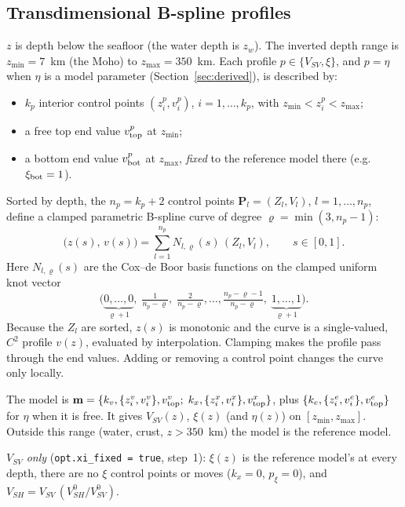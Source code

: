 \documentclass[11pt]{article}
\newcommand{\vsv}{V_{SV}}
\newcommand{\vsh}{V_{SH}}
\begin{document}
\subsection{Transdimensional B-spline profiles}
$z$ is depth below the seafloor (the water depth is $z_w$). The inverted
depth range is $z_{\min}=7$~km (the Moho) to $z_{\max}=350$~km. Each
profile $p\in\{\vsv,\xi\}$, and $p=\eta$ when $\eta$ is a model parameter
(Section~\ref{sec:derived}), is described by:
\begin{itemize}
\item $k_p$ interior control points $(z^p_i,v^p_i)$, $i=1,\dots,k_p$, with $z_{\min}<z^p_i<z_{\max}$;
\item a free top end value $v^p_{\rm top}$ at $z_{\min}$;
\item a bottom end value $v^p_{\rm bot}$ at $z_{\max}$, \emph{fixed} to the
  reference model there (e.g.\ $\xi_{\rm bot}=1$).
\end{itemize}
Sorted by depth, the $n_p=k_p+2$ control points $\mathbf{P}_l=(Z_l,V_l)$,
$l=1,\dots,n_p$, define a clamped parametric B-spline curve of degree
$\varrho=\min(3,n_p-1)$:
\begin{equation}
  \big(z(s),\,v(s)\big)=\sum_{l=1}^{n_p}N_{l,\varrho}(s)\,(Z_l,V_l),\qquad s\in[0,1].
\end{equation}
Here $N_{l,\varrho}(s)$ are the Cox--de Boor basis functions on the clamped
uniform knot vector
\begin{equation}
 \Big(\underbrace{0,\dots,0}_{\varrho+1},\;\tfrac{1}{n_p-\varrho},\;\tfrac{2}{n_p-\varrho},\dots,\tfrac{n_p-\varrho-1}{n_p-\varrho},\;\underbrace{1,\dots,1}_{\varrho+1}\Big).
\end{equation} Because the $Z_l$ are sorted, $z(s)$ is monotonic and
the curve is a single-valued, $C^2$ profile $v(z)$, evaluated by
interpolation. Clamping makes the profile pass through the end values.
Adding or removing a control point changes the curve only locally.

The model is
$\mathbf{m}=\{k_v,\{z^v_i,v^v_i\},v^v_{\rm top};\;k_x,\{z^x_i,v^x_i\},v^x_{\rm top}\}$,
plus $\{k_e,\{z^e_i,v^e_i\},v^e_{\rm top}\}$ for $\eta$ when it is free.
It gives $\vsv(z)$, $\xi(z)$ (and $\eta(z)$) on $[z_{\min},z_{\max}]$. Outside this range
(water, crust, $z>350$~km) the model is the reference model.

\emph{$\vsv$ only} (\texttt{opt.xi\_fixed = true}, step~1): $\xi(z)$ is the
reference model's at every depth, there are no $\xi$ control points or
moves ($k_x=0$, $p_\xi=0$), and $\vsh=\vsv\,(\vsh^0/\vsv^0)$.
\end{document}
